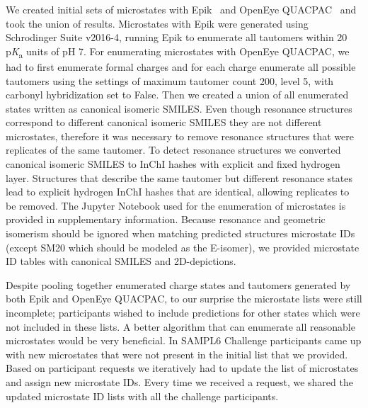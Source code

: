 \documentclass[9pt,lineno,final]{elife}
\newcommand{\pKa}{p\textit{K}\textsubscript{a}}
\begin{document}
We created initial sets of microstates with Epik~\citep{Shelley:2007:J.Comput.AidedMol.Des.} and OpenEye QUACPAC~\citep{quacpac_openeye_2017} and took the union of results. 
Microstates with Epik were generated using Schrodinger Suite v2016-4, running Epik to enumerate all tautomers within 20 \pKa{} units of pH 7.
For enumerating microstates with OpenEye QUACPAC, we had to first enumerate formal charges and for each charge enumerate all possible tautomers using the settings of maximum tautomer count 200, level 5, with carbonyl hybridization set to False.
Then we created a union of all enumerated states written as canonical isomeric SMILES.
Even though resonance structures correspond to different canonical isomeric SMILES they are not different microstates, therefore it was necessary to remove resonance structures that were replicates of the same tautomer. To detect resonance structures we converted canonical isomeric SMILES to InChI hashes with explicit and fixed hydrogen layer. Structures that describe the same tautomer but different resonance states lead to explicit hydrogen InChI hashes that are identical, allowing replicates to be removed. The Jupyter Notebook used for the enumeration of microstates is provided in supplementary information. Because resonance and geometric isomerism should be ignored when matching predicted structures microstate IDs (except SM20 which should be modeled as the E-isomer), we provided microstate ID tables with canonical SMILES and 2D-depictions. 

Despite pooling together enumerated charge states and tautomers generated by both Epik and OpenEye QUACPAC, to our surprise the microstate lists were still incomplete; participants wished to include predictions for other states which were not included in these lists.
A better algorithm that can enumerate all reasonable microstates would be very beneficial. 
In SAMPL6 Challenge participants came up with new microstates that were not present in the initial list that we provided. 
Based on participant requests we iteratively had to update the list of microstates and assign new microstate IDs.
Every time we received a request, we shared the updated microstate ID lists with all the challenge participants.
\end{document}
